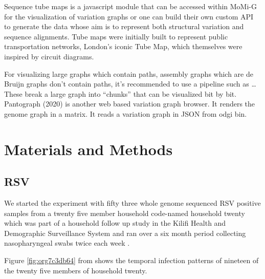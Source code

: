 \documentclass[10pt, a4paper]{article}
\begin{document}
Sequence tube maps \cite{beyerSequenceTubeMaps2019} is a javascript module that
can be accessed within MoMi-G for the visualization of variation graphs or one
can  build their own custom API to generate the data whose aim is to represent
both structural variation and sequence alignments.
Tube maps were initially built to represent public transportation networks,
London’s iconic Tube Map, \cite{cartwrightamBeckRepresentationLondon2012} which
themselves were inspired by circuit diagrams.

For visualizing large graphs which contain paths, assembly graphs which are de
Bruijn graphs don’t contain paths, it’s recommended to use a pipeline such as …
These break a large graph into “chunks” that can be visualized bit by bit.
Pantograph (2020) is another web based variation graph browser.
It renders the genome graph in a matrix. It reads a variation graph in JSON from
odgi bin.


\newpage
\section{Materials and Methods}
\label{sec:orgf9b44f0}
\subsection{RSV}
\label{sec:org83f28a4}
We started the experiment with fifty three whole genome sequenced RSV 
positive samples from a twenty five member household code-named household twenty
which was part of a household follow up study in the Kilifi Health and 
Demographic Surveillance System and ran over a six month
period collecting nasopharyngeal swabs twice each week
\cite{munywokiInfluenceAgeSeverity2015,agotiTransmissionPatternsEvolution2017,githinjiAssessingUtilityMinority2018}.

Figure \ref{fig:org7c3db64} from
\cite{githinjiAssessingUtilityMinority2018} shows the temporal infection patterns
of nineteen of the twenty five members of household twenty.
\end{document}
